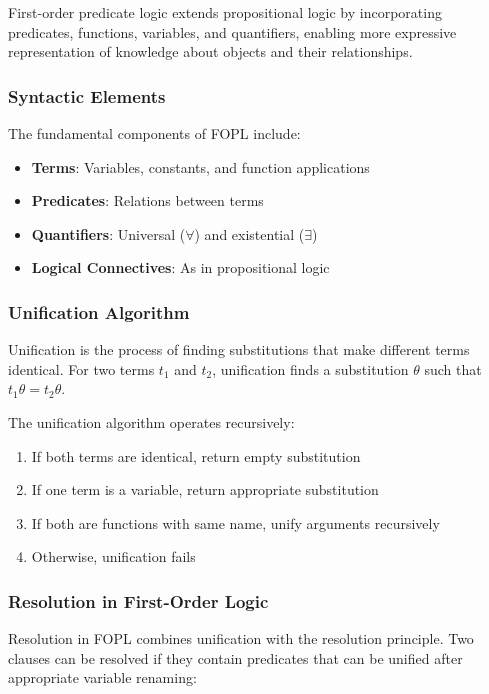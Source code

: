 \documentclass[11pt,a4paper]{article}
\begin{document}
First-order predicate logic extends propositional logic by incorporating predicates, functions, variables, and quantifiers, enabling more expressive representation of knowledge about objects and their relationships.

\subsubsection{Syntactic Elements}

The fundamental components of FOPL include:
\begin{itemize}
    \item \textbf{Terms}: Variables, constants, and function applications
    \item \textbf{Predicates}: Relations between terms
    \item \textbf{Quantifiers}: Universal ($\forall$) and existential ($\exists$)
    \item \textbf{Logical Connectives}: As in propositional logic
\end{itemize}

\subsubsection{Unification Algorithm}

Unification is the process of finding substitutions that make different terms identical. For two terms $t_1$ and $t_2$, unification finds a substitution $\theta$ such that $t_1\theta = t_2\theta$.

The unification algorithm operates recursively:
\begin{enumerate}
    \item If both terms are identical, return empty substitution
    \item If one term is a variable, return appropriate substitution
    \item If both are functions with same name, unify arguments recursively
    \item Otherwise, unification fails
\end{enumerate}

\subsubsection{Resolution in First-Order Logic}

Resolution in FOPL combines unification with the resolution principle. Two clauses can be resolved if they contain predicates that can be unified after appropriate variable renaming:
\end{document}
